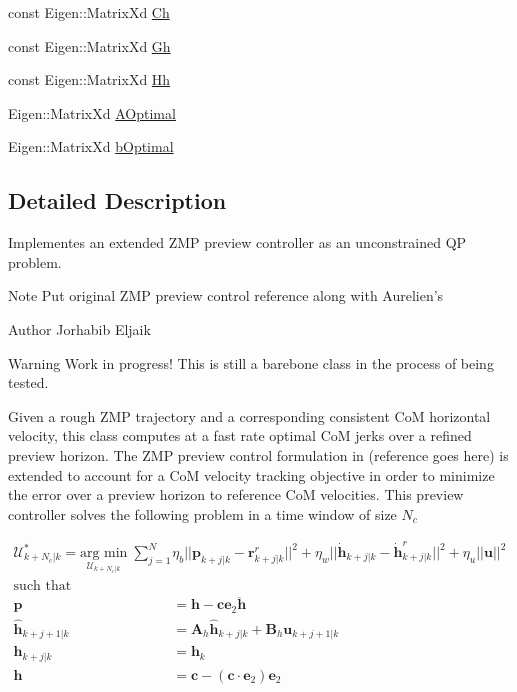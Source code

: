 \begin{DoxyCompactItemize}
const \-Eigen\-::\-Matrix\-Xd \hyperlink{classZmpPreviewController_a2093754713ffb2a7adcd1310c73bf775}{\-Ch}
\item 
const \-Eigen\-::\-Matrix\-Xd \hyperlink{classZmpPreviewController_a9429cb06fdd2c3ca5036a2fd48303632}{\-Gh}
\item 
const \-Eigen\-::\-Matrix\-Xd \hyperlink{classZmpPreviewController_a8caaf8bf8f06e5b0b53d2cd5c131eefd}{\-Hh}
\item 
\-Eigen\-::\-Matrix\-Xd \hyperlink{classZmpPreviewController_a2afe60ed4923414ce4e51a8a7a584fde}{\-A\-Optimal}
\item 
\-Eigen\-::\-Matrix\-Xd \hyperlink{classZmpPreviewController_a049829dccbeb5a7a1bf47f7e6679174a}{b\-Optimal}
\end{DoxyCompactItemize}


\subsection{\-Detailed \-Description}
\-Implementes an extended \-Z\-M\-P preview controller as an unconstrained \-Q\-P problem. 

\begin{DoxyNote}{\-Note}
\-Put original \-Z\-M\-P preview control reference along with \-Aurelien's
\end{DoxyNote}
\begin{DoxyAuthor}{\-Author}
\-Jorhabib \-Eljaik
\end{DoxyAuthor}
\cite{ibanezThesis2015}

\begin{DoxyWarning}{\-Warning}
\-Work in progress! \-This is still a barebone class in the process of being tested.
\end{DoxyWarning}
\-Given a rough \-Z\-M\-P trajectory and a corresponding consistent \-Co\-M horizontal velocity, this class computes at a fast rate optimal \-Co\-M jerks over a refined preview horizon. \-The \-Z\-M\-P preview control formulation in (reference goes here) is extended to account for a \-Co\-M velocity tracking objective in order to minimize the error over a preview horizon to reference \-Co\-M velocities. \-This preview controller solves the following problem in a time window of size $N_c$

\begin{align*} \mathcal{U}_{k+N_c|k}^* = \underset{\mathcal{U}_{k+N_c|k}}{\text{arg min}} \; \sum_{j=1}^{N} & \eta_b || \mathbf{p}_{k+j|k} - \mathbf{r}_{k+j|k}^r ||^2 + \eta_w ||\mathbf{\dot{h}}_{k+j|k} - \dot{\mathbf{h}}^r_{k+j|k} ||^2 + \eta_u || \mathbf{u} ||^2 \\ \text{such that}&\\ \mathbf{p} &= \mathbf{h} - \mathbf{c}\mathbf{e}_2 \mathbf{\ddot{h}} \\ \mathbf{\hat{h}}_{k+j+1|k} &= \mathbf{A}_h \hat{\mathbf{h}}_{k+j|k} + \mathbf{B}_h \mathbf{u}_{k+j+1|k} \\ \mathbf{h}_{k+j|k} &= \mathbf{h}_k\\ \mathbf{h} &= \mathbf{c} - (\mathbf{c}\cdot\mathbf{e}_2)\mathbf{e}_2 \end{align*}


